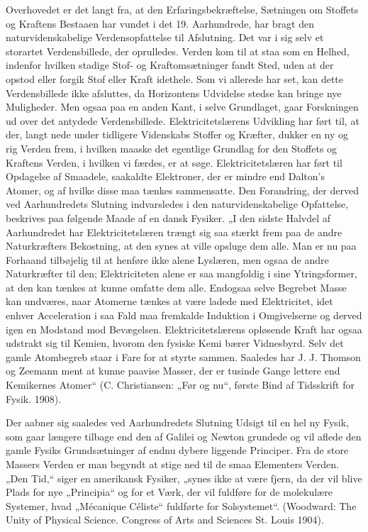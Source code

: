 \documentclass[12pt,a4paper,openany]{book}
\newcommand{\opage}[1]{\marginnote{\footnotesize\textit{[#1]}}}
\begin{document}
Overhovedet er det langt fra, at den Erfaringsbekræftelse, Sætningen
om Stoffets og Kraftens Bestaaen har vundet i det 19. Aarhundrede,
har bragt den naturvidenskabelige Verdensopfattelse til
Afslutning. Det var i sig selv et storartet Verdensbillede, der oprulledes.
Verden kom til at staa som en Helhed, indenfor hvilken stadige
Stof- og Kraftomsætninger fandt Sted, uden at der opstod eller forgik
Stof eller Kraft idethele. Som vi allerede har set, kan dette Verdensbillede
ikke afsluttes, da Horizontens Udvidelse stedse kan
bringe nye Muligheder. Men ogsaa paa en anden Kant, i selve Grundlaget,
gaar Forskningen ud over det antydede Verdensbillede. Elektricitetslærens
Udvikling har ført til, at der, langt nede under tidligere
Videnskabs Stoffer og Kræfter, dukker en ny og rig Verden
frem, i hvilken maaske det egentlige Grundlag for den Stoffets og
Kraftens Verden, i hvilken vi færdes, er at søge. Elektricitetslæren
har ført til Opdagelse af Smaadele, saakaldte Elektroner, der er
mindre end Dalton’s Atomer, og af hvilke disse maa tænkes sammensatte.
Den Forandring, der derved ved Aarhundredets Slutning
indvarsledes i den naturvidenskabelige Opfattelse, beskrives paa følgende
Maade af en dansk Fysiker. „I den sidste Halvdel af Aarhundredet
har Elektricitetslæren trængt sig saa stærkt frem paa de andre
Naturkræfters Bekostning, at den synes at ville opsluge dem
\opage{31}alle. Man er nu paa Forhaand tilbøjelig til at henføre ikke alene
Lyslæren, men ogsaa de andre Naturkræfter til den; Elektriciteten
alene er saa mangfoldig i sine Ytringsformer, at den kan tænkes at
kunne omfatte dem alle. Endogsaa selve Begrebet Masse kan undværes,
naar Atomerne tænkes at være ladede med Elektricitet, idet
enhver Acceleration i saa Fald maa fremkalde Induktion i Omgivelserne
og derved igen en Modstand mod Bevægelsen. Elektricitetslærens
opløsende Kraft har ogsaa udstrakt sig til Kemien, hvorom
den fysiske Kemi bærer Vidnesbyrd. Selv det gamle Atombegreb
staar i Fare for at styrte sammen. Saaledes har J. J. Thomson og
Zeemann ment at kunne paavise Masser, der er tusinde Gange lettere
end Kemikernes Atomer“ (C. Christiansen: „Før og nu“, første
Bind af Tidsskrift for Fysik. 1908).

Der aabner sig saaledes ved Aarhundredets Slutning Udsigt til en
hel ny Fysik, som gaar længere tilbage end den af Galilei og Newton
grundede og vil aflede den gamle Fysiks Grundsætninger af endnu
dybere liggende Principer. Fra de store Massers Verden er man begyndt
at stige ned til de smaa Elementers Verden. „Den Tid,“ siger
en amerikansk Fysiker, „synes ikke at være fjern, da der vil blive
Plads for nye „Principia“ og for et Værk, der vil fuldføre for de
molekulære Systemer, hvad „Mécanique Céliste“ fuldførte for Solsystemet“.
(Woodward: The Unity of Physical Science. Congress of
Arts and Sciences St. Louis 1904).
\end{document}
